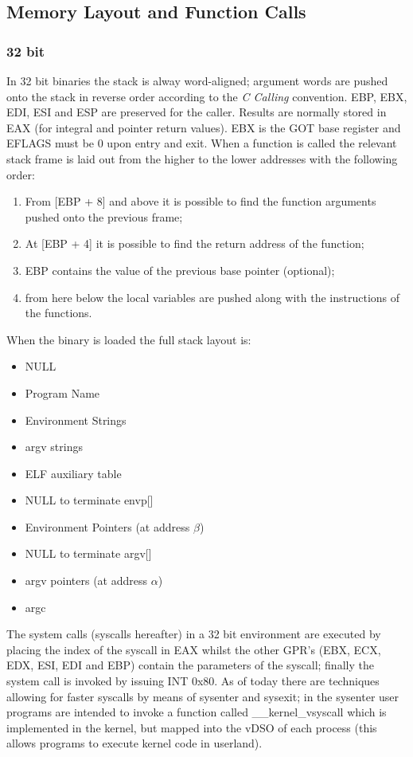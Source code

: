 \subsection{Memory Layout and Function Calls}

\subsubsection{32 bit}
In 32 bit binaries the stack is alway word-aligned; argument words are pushed onto the stack in reverse order according
to the \textit{C Calling} convention. EBP, EBX, EDI, ESI and ESP are preserved for the caller. Results are normally
stored in EAX (for integral and pointer return values). EBX is the GOT base register and EFLAGS must be 0 upon entry and
exit.
When a function is called the relevant stack frame is laid out from the higher to the lower addresses with the 
following order:
\begin{enumerate}
    \item From [{\ttfamily EBP + 8}] and above it is possible to find the function arguments pushed onto the previous
        frame;
    \item At [{\ttfamily EBP + 4}] it is possible to find the return address of the function;
    \item {\ttfamily EBP} contains the value of the previous base pointer (optional);
    \item from here below the local variables are pushed along with the instructions of the functions.
\end{enumerate}
When the binary is loaded the full stack layout is:
\begin{itemize}
    \item NULL
    \item Program Name
    \item Environment Strings
    \item {\ttfamily argv} strings
    \item ELF auxiliary table
    \item NULL to terminate {\ttfamily envp[]}
    \item Environment Pointers (at address $\beta$)
    \item NULL to terminate {\ttfamily argv[]}
    \item {\ttfamily argv} pointers (at address $\alpha$)
    \item {\ttfamily argc}
\end{itemize}
The system calls (syscalls hereafter) in a 32 bit environment are executed by placing the index of the syscall in
EAX whilst the other GPR's (EBX, ECX, EDX, ESI, EDI and EBP) contain the parameters of the syscall; finally
the system call is invoked by issuing {\ttfamily INT 0x80}.
As of today there are techniques allowing for faster syscalls by means of {\ttfamily sysenter} and {\ttfamily sysexit};
in the {\ttfamily sysenter} user programs are intended to invoke a function called {\ttfamily \_\_kernel\_vsyscall}
which is implemented in the kernel, but mapped into the vDSO of each process (this allows programs to execute kernel
code in userland).

